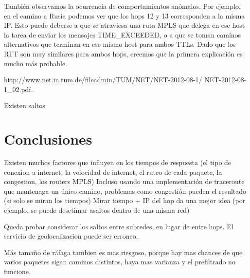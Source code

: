 También observamos la ocurrencia de comportamientos anómalos. Por ejemplo, en el camino a Rusia podemos ver que los hops 12 y 13 corresponden a la misma IP. Esto puede deberse a que se atraviesa una ruta MPLS que delega en ese host la tarea de enviar los mensajes TIME_EXCEEDED, o a que se toman caminos alternativos  que terminan en ese mismo host para ambos TTLs. Dado que los RTT son muy similares para ambos hops, creemos que la primera explicación es mucho más probable.

http://www.net.in.tum.de/fileadmin/TUM/NET/NET-2012-08-1/
NET-2012-08-1\_02.pdf. 



Existen saltos 


\section{Conclusiones}

	Existen muchos factores que influyen en los tiempos de respuesta (el tipo de conexion a internet, la velocidad de internet, el ruteo de cada paquete, la congestion, los routers MPLS)
	Incluso usando una implementación de traceroute que mantenaga un único camino, problemas como congestión pueden el resultado (si solo se miran los tiempos)
	Mirar tiempo + IP del hop da una mejor idea (por ejemplo, se puede desetimar asaltos dentro de una misma red)

	Queda probar considerar los saltos entre subredes, en lugar de entre hops.
	El servicio de geolocalizacion puede ser erroneo.
	

Más tamaño de ráfaga tambien es mas riesgoso, porque hay mas chances de que varios paquetes sigan caminos distintos, haya mas varianza y el prefiltrado no funcione.
